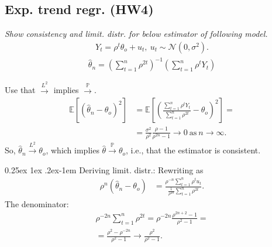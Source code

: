 \documentclass[9pt]{extarticle}
\makeatletter
\newcommand{\PP}{\mathbb{P}}
\newcommand{\EE}{\mathbb{E}}
\renewcommand{\paragraph}{%
  \@startsection{paragraph}{4}%
  {\z@}{0.25ex \@plus 1ex \@minus .2ex}{-1em}%
  {\normalfont\normalsize\bfseries}%
}
\newcommand{\parrow}{\overset{\PP}{\rightarrow}}
\newcommand{\Ltwoarrow}{\overset{L^2}{\rightarrow}}
\makeatother
\begin{document}
\begin{multicols*}{4}
\subsection*{Exp. trend regr. (HW4)}
\emph{Show consistency and limit. distr. for below estimator of following model.}
\begin{gather*}
    Y_t = \rho^t \theta_o + u_t,~u_t \sim \mathcal{N}(0, \sigma^2).
\end{gather*}
\newcommand{\hth}{\hat{\theta}}
\begin{gather*}
    \hth_n = \left(\sum_{t=1}^n \rho^{2t}\right)^{-1}\left(
    \sum_{t=1}^n \rho^t Y_t
    \right)
\end{gather*}

Use that $\Ltwoarrow$ implies $\parrow$.
\begin{align*}
    \EE[(\hth_n - \theta_o)^2] &= \EE[(\frac{\sum_{t=1}^n \rho^t Y_t}{\sum_{t=1}^n \rho^{2t}} - \theta_o)^2] = \\
    &= \frac{\sigma^2}{\rho^2} \frac{\rho - 1}{\rho^{2n}- 1} \rightarrow 0 ~\text{as}~n\rightarrow \infty.
\end{align*}
So, $\hth_n \Ltwoarrow \theta_o$, which implies $\hth \parrow \theta_o$, i.e., that the estimator is consistent.

\paragraph{Deriving limit. distr.:}
Rewriting as
\begin{align*}
    \rho^{n}(\hth_n - \theta_o) &= \frac{\rho^{-n}\sum_{t=1}^n \rho^t u_t}{\frac{1}{\rho^{2n}}\sum_{t=1}^n \rho^{2t}}.
\end{align*}
The denominator:
\begin{gather*}
    \rho^{-2n}\sum_{t=1}^n \rho^{2t} = \rho^{-2n} \frac{\rho^{2n+2} - 1}{\rho^2 - 1} = \\
    = \frac{\rho^2 - \rho^{-2n}}{\rho^2-1} \rightarrow \frac{\rho^2 }{\rho^2 -1}.
\end{gather*}


\end{multicols*}
\end{document}
